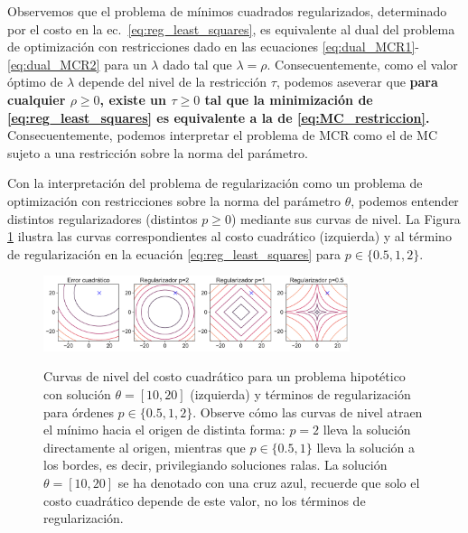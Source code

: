 \begin{mdframed}[style=discusion, frametitle={\center Mínimos cuadrados regularizados: optimización con restricciones}]
Observemos que el problema de mínimos cuadrados regularizados, determinado por el costo en la ec.~\eqref{eq:reg_least_squares}, es equivalente al dual del problema de optimización con restricciones dado en las ecuaciones \eqref{eq:dual_MCR1}-\eqref{eq:dual_MCR2} para un $\lambda$ dado tal que $\lambda =\rho$. Consecuentemente, como el valor óptimo de $\lambda$ depende del nivel de la restricción $\tau$, podemos aseverar que \textbf{para cualquier $\rho\geq0$, existe un $\tau\geq0$ tal que la minimización de \eqref{eq:reg_least_squares} es equivalente a la de \eqref{eq:MC_restriccion}.} Consecuentemente,  podemos interpretar el problema de MCR como el de MC sujeto a una restricción sobre la norma del parámetro. 
	
\end{mdframed}

Con la interpretación del problema de regularización como un problema de optimización con restricciones sobre la norma del parámetro $\theta$, podemos entender distintos regularizadores (distintos $p\geq0$) mediante sus curvas de nivel. La Figura \ref{fig:reg_lin_reg} ilustra las curvas correspondientes al costo cuadrático (izquierda) y al término de regularización en la ecuación \eqref{eq:reg_least_squares} para $p\in\{0.5,1,2\}$. 

\begin{figure}[H]
	\centering
	\includegraphics[width=0.8\textwidth]{img/cap2_regularizadores.pdf}\\
	\caption{Curvas de nivel del costo cuadrático para un problema hipotético con solución $\theta=[10,20]$ (izquierda) y términos de regularización para órdenes $p\in\{0.5,1,2\}$. Observe cómo las curvas de nivel atraen el mínimo hacia el origen de distinta forma: $p=2$ lleva la solución directamente al origen, mientras que $p\in\{0.5,1\}$ lleva la solución a los bordes, es  decir, privilegiando soluciones ralas. La solución $\theta=[10,20]$ se ha denotado con una cruz azul, recuerde que solo el costo cuadrático depende de este valor, no los términos de regularización. }
	\label{fig:reg_lin_reg}  
\end{figure}

